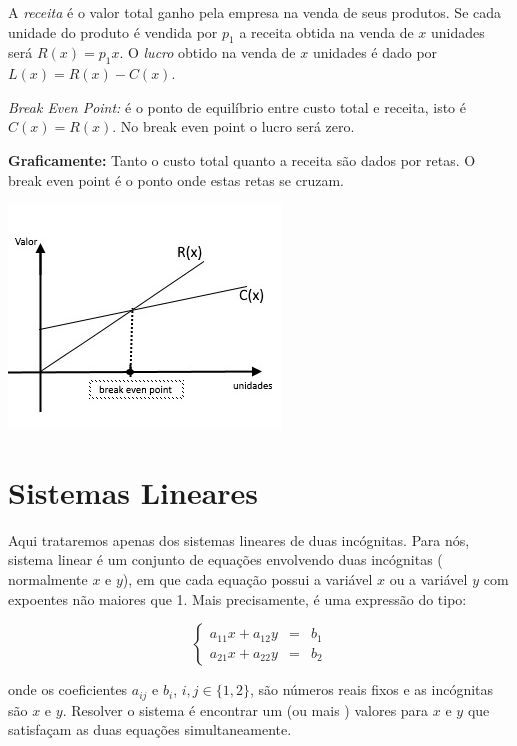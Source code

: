 A \textit{receita} é o valor total ganho pela empresa na venda de seus produtos. Se cada unidade do produto é vendida por $p_1$
a receita obtida na venda de $x$ unidades será $R(x)=p_1x$. O \textit{lucro} obtido na venda de $x$ unidades é dado por $L(x)=R(x)-C(x)$.

\noindent\textit{Break Even Point:} é o ponto de equilíbrio entre custo total e receita, isto é $C(x)=R(x)$. No break even point o lucro será zero.


\noindent\textbf{Graficamente:} Tanto o custo total quanto a receita são dados por retas. O break even point é o ponto onde estas retas se cruzam.


\begin{center}
\includegraphics{./chapters/preliminares/imgs/breakeven}
\end{center}


\section{Sistemas Lineares}

Aqui trataremos apenas dos sistemas lineares de duas incógnitas. Para nós, sistema linear é um conjunto de equações
envolvendo duas incógnitas ( normalmente $x$ e $y$), em que cada equação possui a variável $x$ ou a variável $y$
com expoentes não maiores que 1. Mais precisamente, é uma expressão do tipo:

$$\left\{ \begin{array}{rcl}
a_{11}x+a_{12}y&=&b_1\\
a_{21}x+a_{22}y&=&b_2
\end{array}\right.$$

onde os coeficientes $a_{ij}$ e $b_{i}$, $i,j\in \{1,2\}$, são números reais fixos e as incógnitas são $x$ e $y$. Resolver o sistema é encontrar
um (ou mais ) valores para $x$ e $y$ que satisfaçam as duas equações simultaneamente.

